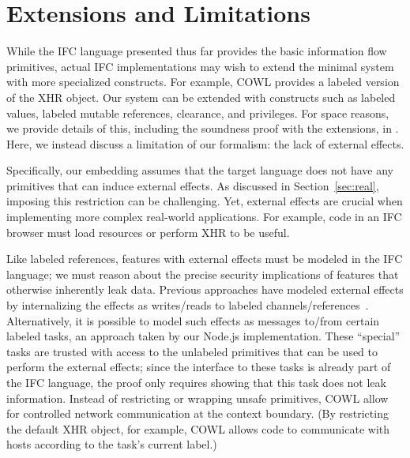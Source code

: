 
\section{Extensions and Limitations}
\label{sec:extensions}
\label{sec:extensions:labeled}

While the IFC language presented thus far provides the basic
information flow primitives, actual IFC implementations
may wish to extend the minimal system with more specialized
constructs.
For example, COWL provides a labeled version of the XHR object.
%
Our system can be extended with constructs such as labeled values,
labeled mutable references, clearance, and privileges.
For space reasons, we provide
details of this, including the soundness
proof with the extensions, in \appendixextfirst{}.
%
Here, we instead discuss a limitation of our formalism: the lack of
external effects.


Specifically, our embedding assumes that the target language does not
have any primitives that can induce external effects.
%
As discussed in Section~\ref{sec:real}, imposing this restriction
can be challenging.
%
Yet, external effects are crucial when implementing more complex
real-world applications.
%
For example, code in an IFC browser must load resources or
perform XHR to be useful.

Like labeled references, features with external effects must be
modeled in the IFC language; we must reason about the precise security
implications of features that otherwise inherently leak data.
%
Previous approaches have modeled external effects by internalizing the
effects as writes/reads to labeled channels/references~\cite{stefan:addressing-covert}.
%
Alternatively, it is possible to model such effects as messages to/from
certain labeled tasks, an approach taken by our Node.js
implementation.
%
These ``special'' tasks are trusted with access to the unlabeled
primitives that can be used to perform the external effects; since the
interface to these tasks is already part of the IFC language, the
proof only requires showing that this task does not leak information.
%
Instead of restricting or wrapping unsafe primitives,
COWL allow for
controlled network communication at the context boundary.
%
(By restricting the default XHR object, for example, COWL allows code
to communicate with hosts according to the task's current label.)
